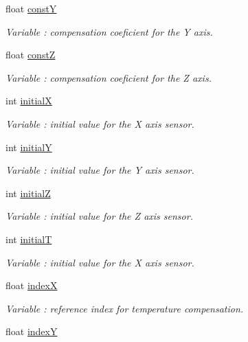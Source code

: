 \begin{DoxyCompactItemize}
float \hyperlink{class_wasp_sensor_parking_a1b4300f89f26d8d8a0c104ce16a21181}{constY}
\begin{DoxyCompactList}\small\item\em Variable \+: compensation coeficient for the Y axis. \end{DoxyCompactList}\item 
float \hyperlink{class_wasp_sensor_parking_aa0af7fe7d7661cf7f36f162d92e834f0}{constZ}
\begin{DoxyCompactList}\small\item\em Variable \+: compensation coeficient for the Z axis. \end{DoxyCompactList}\item 
int \hyperlink{class_wasp_sensor_parking_a0010d75cfb492aef0794721fa9b762ef}{initialX}
\begin{DoxyCompactList}\small\item\em Variable \+: initial value for the X axis sensor. \end{DoxyCompactList}\item 
int \hyperlink{class_wasp_sensor_parking_a1123948e8e4dcff6c6ad7c6d888140c8}{initialY}
\begin{DoxyCompactList}\small\item\em Variable \+: initial value for the Y axis sensor. \end{DoxyCompactList}\item 
int \hyperlink{class_wasp_sensor_parking_ac9701254b08807f587833464815f1a5a}{initialZ}
\begin{DoxyCompactList}\small\item\em Variable \+: initial value for the Z axis sensor. \end{DoxyCompactList}\item 
int \hyperlink{class_wasp_sensor_parking_adb9a140ea401fbd67abc125f9e1d876f}{initialT}
\begin{DoxyCompactList}\small\item\em Variable \+: initial value for the X axis sensor. \end{DoxyCompactList}\item 
float \hyperlink{class_wasp_sensor_parking_a02772d82b8822128cced1a7b596286b0}{indexX}
\begin{DoxyCompactList}\small\item\em Variable \+: reference index for temperature compensation. \end{DoxyCompactList}\item 
float \hyperlink{class_wasp_sensor_parking_a47e833790acf534eec8ab1d520c5c38c}{indexY}

\end{DoxyCompactItemize}
